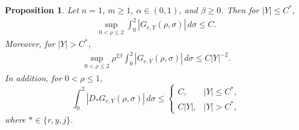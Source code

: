 \documentclass[12pt]{amsart}
\newtheorem{proposition}[theorem]{Proposition}
\begin{document}
\begin{proposition}\label{prop:Green:n=1:even}
Let $n=1$, $m\ge 1$, $\alpha\in (0,1)$, and $\beta\ge 0$. Then for $|Y|\le C^*$,
\begin{align}\label{eq:prop:Green:even:1}
\sup_{0<\rho\le 2} \int_0^2 |G_{e,Y}(\rho,\sigma)| \, d\sigma \le C.
\end{align}
Moreover, for $|Y|>C^*$,
\begin{align}\label{eq:prop:Green:even:2}
    \sup_{0<\rho\le 2} \rho^{2\beta}\int_0^2 |G_{e,Y}(\rho,\sigma)| \, d\sigma \le C|Y|^{-2}.
\end{align}
In addition, for $0<\rho\le 1$,
\begin{equation}\label{eq:prop:Green:even:3}
     \int_0^2 |D_* G_{e,Y}(\rho,\sigma)| \, d\sigma \le \begin{cases}
         C, & |Y|\le C^*,\\[4pt]
         C|Y|, & |Y|>C^*,
     \end{cases}
\end{equation}
where $*\in\{r,y,j\}$.
\end{proposition}
\end{document}
